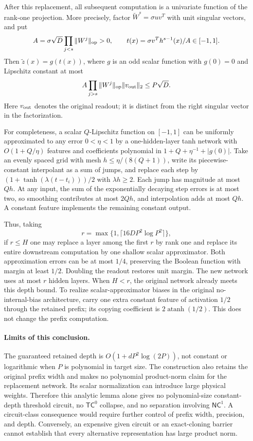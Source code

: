 After this replacement, all subsequent computation is a univariate
function of the rank-one projection. More precisely, factor
$\widetilde W^s=\sigma uv^T$ with unit singular vectors, and put
\[
 A=\sigma\sqrt D\prod_{j<s}\|W^j\|_{\rm op}>0,
 \qquad t(x)=\sigma v^Th^{s-1}(x)/A\in[-1,1].
\]
Then $\widetilde z(x)=g(t(x))$, where $g$ is an odd scalar function with
$g(0)=0$ and Lipschitz constant at most
\[
 A\prod_{j>s}\|W^j\|_{\rm op}\|v_{\rm out}\|_2
 \le P\sqrt D.
\]
Here $v_{\rm out}$ denotes the original readout; it is distinct from the
right singular vector in the factorization.

For completeness, a scalar $Q$-Lipschitz function on $[-1,1]$ can be
uniformly approximated to any error $0<\eta<1$ by a one-hidden-layer tanh
network with $O(1+Q/\eta)$ features and coefficients polynomial in
$1+Q+\eta^{-1}+|g(0)|$. Take an evenly spaced grid with mesh
$h\le\eta/(8(Q+1))$, write its piecewise-constant interpolant as a sum
of jumps, and replace each step by $(1+\tanh(\lambda(t-t_i)))/2$ with
$\lambda h\ge2$. Each jump has magnitude at most $Qh$. At any input,
the sum of the exponentially decaying step errors is at most two,
so smoothing contributes at most $2Qh$, and interpolation adds at most
$Qh$. A constant feature implements the remaining constant output.

Thus, taking
\[
 r=\max\{1,\lceil16DP^2\log P^2\rceil\},
\]
if $r\le H$ one may replace a layer among the first $r$ by rank one
and replace its entire downstream computation by one shallow scalar
approximator. Both approximation errors can be at most $1/4$, preserving
the Boolean function with margin at least $1/2$. Doubling the readout
restores unit margin. The new network uses at most $r$ hidden layers.
When $H<r$, the original network already meets this depth bound.
To realize scalar-approximator biases in the original no-internal-bias
architecture, carry one extra constant feature of activation $1/2$
through the retained prefix; its copying coefficient is
$2\operatorname{atanh}(1/2)$. This does not change the prefix computation.

\paragraph{Limits of this conclusion.}
The guaranteed retained depth is $O(1+dP^2\log(2P))$, not constant or
logarithmic when $P$ is polynomial in target size. The construction also
retains the original prefix width and makes no polynomial product-norm
claim for the replacement network. Its scalar normalization can introduce
large physical weights. Therefore this analytic lemma alone gives no
polynomial-size constant-depth threshold circuit, no $\mathsf{TC}^0$
collapse, and no separation involving $\mathsf{NC}^1$. A circuit-class
consequence would require further control of prefix width, precision,
and depth. Conversely, an expensive given circuit or an exact-cloning
barrier cannot establish that every alternative representation has large
product norm.
